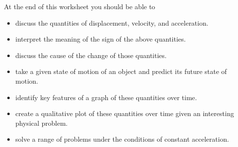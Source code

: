 At the end of this worksheet you should be able to  
\begin{itemize}
	\item discuss the quantities of displacement, velocity, and acceleration.
	\item interpret the meaning of the sign of the above quantities.
	\item discuss the cause of the change of those quantities.
	\item take a given state of motion of an object and predict its future state of motion.
	\item identify key features of a graph of these quantities over time.
	\item create a qualitative plot of these quantities over time given an interesting physical problem.
	\item solve a range of problems under the conditions of constant acceleration. 
\end{itemize}

